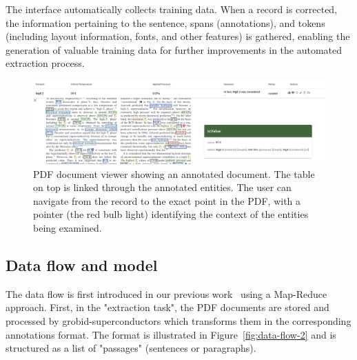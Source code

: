 \documentclass[a4paper]{article}
\begin{document}
The interface automatically collects training data. When a record is corrected, the information pertaining to the sentence, spans (annotations), and tokens (including layout information, fonts, and other features) is gathered, enabling the generation of valuable training data for further improvements in the automated extraction process.

\begin{figure}[ht]
  \centering
  \includegraphics[width=1\textwidth]{images/pdf-view-context.png} 
  \caption{PDF document viewer showing an annotated document. The table on top is linked through the annotated entities. The user can navigate from the record to the exact point in the PDF, with a pointer (the red bulb light) identifying the context of the entities being examined. }
  \label{fig:pdf-view}
\end{figure}



\subsection{Data flow and model}
\label{subsec:data-flow}

The data flow is first introduced in our previous work~\cite{lfoppiano2023automatic} using a Map-Reduce approach. 
First, in the "extraction task", the PDF documents are stored and processed by grobid-superconductors which transforms them in the corresponding annotations format. The format is illustrated in Figure~\ref{fig:data-flow-2} and is structured as a list of "passages" (sentences or paragraphs). 
\end{document}
